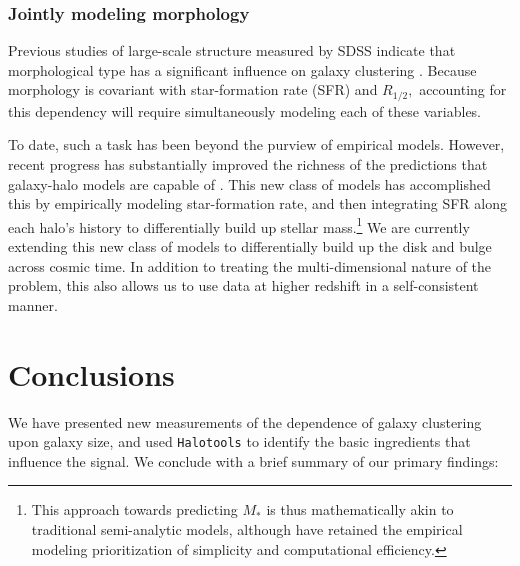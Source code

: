 \documentclass[usenatbib,usegraphicx,letterpaper]{mn2e}
\newcommand{\rhalf}{R_{1/2}}
\newcommand{\mstar}{M_{\ast}}
\begin{document}
\subsubsection{Jointly modeling morphology}

Previous studies of large-scale structure measured by SDSS indicate that morphological type has a significant influence on galaxy clustering \citep{skibba_etal08}. Because morphology is covariant with star-formation rate (SFR) and $\rhalf,$ accounting for this dependency will require simultaneously modeling each of these variables. 

To date, such a task has been beyond the purview of empirical models. However, recent progress has substantially improved the richness of the predictions that galaxy-halo models are capable of \citep{becker15,cohn17,moster_etal17}. This new class of models has accomplished this by empirically modeling star-formation rate, and then integrating SFR along each halo's history to differentially build up stellar mass.\footnote{This approach towards predicting $\mstar$ is thus mathematically akin to traditional semi-analytic models, although \citet{becker15} have retained the empirical modeling prioritization of simplicity and computational efficiency.} We are currently extending this new class of models to differentially build up the disk and bulge across cosmic time. In addition to treating the multi-dimensional nature of the problem, this also allows us to use data at higher redshift in a self-consistent manner.  


\section{Conclusions}
\label{sec:conclusion}

We have presented new measurements of the dependence of galaxy clustering upon galaxy size, and used {\tt Halotools} to identify the basic ingredients that influence the signal. We conclude with a brief summary of our primary findings:
\end{document}
